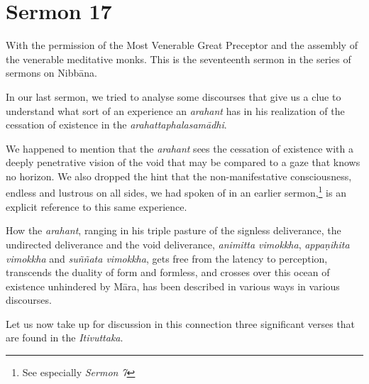\chapter{Sermon 17}

\NibbanaOpeningQuote

With the permission of the Most Venerable Great Preceptor and the assembly of the venerable meditative monks. This is the seventeenth sermon in the series of sermons on Nibbāna.

In our last sermon, we tried to analyse some discourses that give us a clue to understand what sort of an experience an \emph{arahant} has in his realization of the cessation of existence in the \emph{arahattaphalasamādhi}.

We happened to mention that the \emph{arahant} sees the cessation of existence with a deeply penetrative vision of the void that may be compared to a gaze that knows no horizon. We also dropped the hint that the non-manifestative consciousness, endless and lustrous on all sides, we had spoken of in an earlier sermon,\footnote{See especially \emph{Sermon 7}} is an explicit reference to this same experience.

How the \emph{arahant}, ranging in his triple pasture of the signless deliverance, the undirected deliverance and the void deliverance, \emph{animitta vimokkha}, \emph{appaṇihita vimokkha} and \emph{suññata vimokkha}, gets free from the latency to perception, transcends the duality of form and formless, and crosses over this ocean of existence unhindered by Māra, has been described in various ways in various discourses.

Let us now take up for discussion in this connection three significant verses that are found in the \emph{Itivuttaka}.

